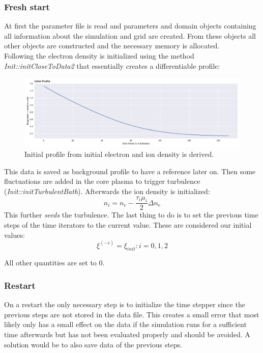 \documentclass[master.tex]{subfiles}
\begin{document}
\subsubsection{Fresh start}
At first the parameter file is read and parameters and domain objects containing all information about the simulation and grid are created. From these objects all other objects are constructed and the necessary memory is allocated.\\
Following the electron density is initialized using the method \textit{Init::initCloseToData2} that essentially creates a differentiable profile:
\begin{figure}[!hbt]
    \centering
    \includegraphics[width=\linewidth]{pdfs/initial_profile.pdf}
    \caption{Initial profile from initial electron and ion density is derived.}
    \label{fig:initial_profile}
\end{figure}

This data is saved as background profile to have a reference later on.
Then some fluctuations are added in the core plasma to trigger turbulence (\textit{Init::initTurbulentBath}). Afterwards the ion density is initialized:
\begin{equation}
    n_i = n_e - \frac{\tau_i \mu_i}{2} \Delta n_e
\end{equation}
This further \textit{seeds} the turbulence. The last thing to do is to set the previous time steps of the time iterators to the current value. These are considered our initial values:
\begin{equation}
    \xi^{(-i)} = \xi_{init} \colon i = 0, 1, 2
\end{equation}

All other quantities are set to 0.


\subsubsection{Restart}
On a restart the only necessary step is to initialize the time stepper since the previous steps are not stored in the data file. This creates a small error that most likely only has a small effect on the data if the simulation runs for a sufficient time afterwards but has not been evaluated properly and should be avoided. A solution would be to also save data of the previous steps.
\end{document}
